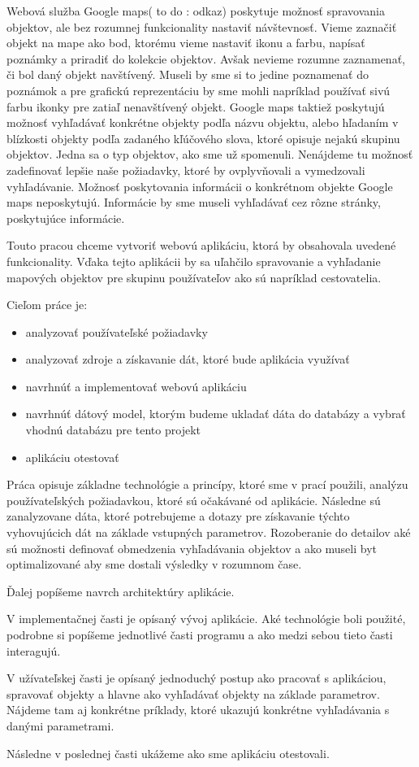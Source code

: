 Webová služba Google maps( to do : odkaz) poskytuje možnosť spravovania objektov, ale bez rozumnej 
funkcionality nastaviť návštevnosť. Vieme zaznačiť objekt na mape ako bod, ktorému vieme 
nastaviť ikonu a farbu, napísať poznámky a priradiť do kolekcie objektov. Avšak nevieme rozumne zaznamenať,
či bol daný objekt navštívený. Museli by sme si to jedine poznamenať do poznámok a  
pre grafickú reprezentáciu by sme mohli napríklad používať sivú farbu ikonky pre zatiaľ nenavštívený objekt. 
Google maps taktiež poskytujú možnosť vyhľadávať konkrétne objekty podľa názvu objektu, alebo hľadaním 
v blízkosti objekty podľa zadaného kľúčového slova, ktoré opisuje nejakú skupinu objektov. Jedna sa o typ objektov,
ako sme už spomenuli. Nenájdeme tu možnosť zadefinovať lepšie naše požiadavky, ktoré by ovplyvňovali a 
vymedzovali vyhľadávanie. Možnosť poskytovania informácii o konkrétnom objekte Google maps neposkytujú. Informácie by sme museli 
vyhľadávať cez rôzne stránky, poskytujúce informácie. 

Touto pracou chceme vytvoriť 
webovú aplikáciu, ktorá by obsahovala uvedené funkcionality. Vďaka tejto aplikácii by sa uľahčilo spravovanie a vyhľadanie 
mapových objektov pre skupinu používateľov ako sú napríklad cestovatelia. 

Cieľom práce je:
\begin{itemize}
    \item analyzovať používateľské požiadavky
    \item analyzovať zdroje a získavanie dát, ktoré bude aplikácia využívať
    \item navrhnúť a implementovať webovú aplikáciu
    \item navrhnúť dátový model, ktorým budeme ukladať dáta do databázy a vybrať vhodnú databázu pre tento projekt
    \item aplikáciu otestovať
\end{itemize}

Práca opisuje základne technológie a princípy, ktoré sme v prací použili, analýzu používateľských požiadavkou, ktoré sú očakávané od aplikácie. Následne sú  
zanalyzovane dáta, ktoré potrebujeme a dotazy pre získavanie týchto vyhovujúcich dát na základe vstupných 
parametrov. Rozoberanie do detailov aké sú možnosti definovať obmedzenia vyhľadávania objektov a ako museli byt optimalizované aby sme dostali výsledky v rozumnom čase. 

Ďalej popíšeme navrch architektúry aplikácie. 

V implementačnej časti je opísaný vývoj aplikácie. Aké technológie boli použité, podrobne si popíšeme 
jednotlivé časti programu a ako medzi sebou tieto časti interagujú. 

V užívateľskej časti je opísaný jednoduchý postup ako pracovať s aplikáciou, spravovať objekty a hlavne 
ako vyhľadávať objekty na základe parametrov. Nájdeme tam aj konkrétne príklady, ktoré ukazujú konkrétne vyhľadávania s danými parametrami. 

Následne v poslednej časti ukážeme ako sme aplikáciu otestovali. 
